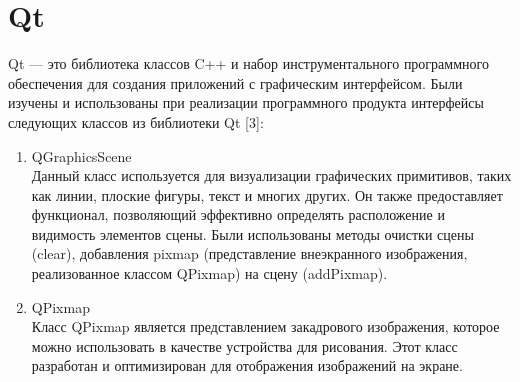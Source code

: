 \documentclass[a4paper,14pt]{extreport}
\begin{document}
		\section{Qt}
		Qt — это библиотека классов C++ и набор инструментального 
программного обеспечения для создания приложений с графическим 
интерфейсом. Были изучены и использованы при реализации программного 
продукта интерфейсы следующих классов из библиотеки Qt [3]: 
		\begin{enumerate}
			\item  QGraphicsScene \\
				Данный класс используется для визуализации графических примитивов, 
таких как линии, плоские фигуры, текст и многих других. Он также 
предоставляет функционал, позволяющий эффективно определять 
расположение и видимость элементов сцены. Были использованы 
методы очистки сцены (clear), добавления pixmap (представление 
внеэкранного изображения, реализованное классом QPixmap) на сцену 
(addPixmap).
			\item QPixmap \\
				Класс QPixmap является представлением закадрового изображения, 
которое можно использовать в качестве устройства для рисования. Этот 
класс разработан и оптимизирован для отображения изображений на 
экране.


\end{enumerate}
\end{document}
